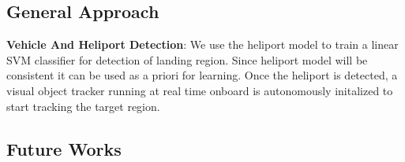 \documentclass{standalone}
\begin{document}
\subsection{General Approach}

\textbf{Vehicle And Heliport Detection}: We use the heliport model to train a linear SVM classifier for detection of landing region. Since heliport model will be consistent it can be used as a priori for learning. Once the heliport is detected, a visual object tracker running at real time onboard is autonomously initalized to start tracking the target region. 

\textbf{}


\subsection{Future Works}
\end{document}
